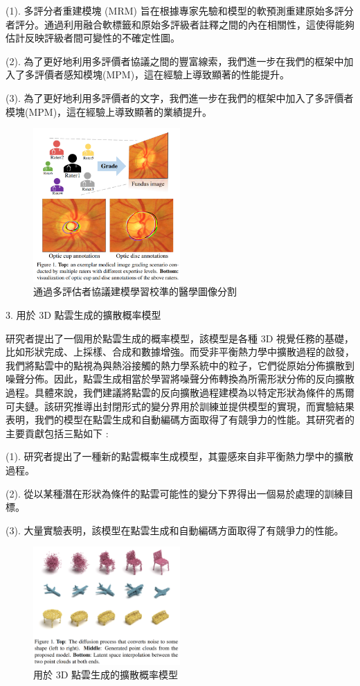 \documentclass[10pt,UTF8]{ctexart}
\begin{document}
(1). 多評分者重建模塊 (MRM) 旨在根據專家先驗和模型的軟預測重建原始多評分者評分。通過利用融合軟標籤和原始多評級者註釋之間的內在相關性，這使得能夠估計反映評級者間可變性的不確定性圖。

(2). 為了更好地利用多評價者協議之間的豐富線索，我們進一步在我們的框架中加入了多評價者感知模塊(MPM)，這在經驗上導致顯著的性能提升。

(3). 為了更好地利用多評價者的文字，我們進一步在我們的框架中加入了多評價者模塊(MPM)，這在經驗上導致顯著的業績提升。

\begin{figure}[H]
\centering 
\includegraphics[width=0.50\textwidth]{r2.png} 
\caption{通過多評估者協議建模學習校準的醫學圖像分割}
\label{Test}
\end{figure}

3. 用於 3D 點雲生成的擴散概率模型

研究者提出了一個用於點雲生成的概率模型，該模型是各種 3D 視覺任務的基礎，比如形狀完成、上採樣、合成和數據增強。而受非平衡熱力學中擴散過程的啟發，我們將點雲中的點視為與熱浴接觸的熱力學系統中的粒子，它們從原始分佈擴散到噪聲分佈。因此，點雲生成相當於學習將噪聲分佈轉換為所需形狀分佈的反向擴散過程。具體來說，我們建議將點雲的反向擴散過程建模為以特定形狀為條件的馬爾可夫鏈。該研究推導出封閉形式的變分界用於訓練並提供模型的實現，而實驗結果表明，我們的模型在點雲生成和自動編碼方面取得了有競爭力的性能。其研究者的主要貢獻包括三點如下 :

(1). 研究者提出了一種新的點雲概率生成模型，其靈感來自非平衡熱力學中的擴散過程。

(2). 從以某種潛在形狀為條件的點雲可能性的變分下界得出一個易於處理的訓練目標。

(3). 大量實驗表明，該模型在點雲生成和自動編碼方面取得了有競爭力的性能。

\begin{figure}[H]
\centering 
\includegraphics[width=0.50\textwidth]{r3.png} 
\caption{用於 3D 點雲生成的擴散概率模型}
\label{Test}
\end{figure}
\end{document}
